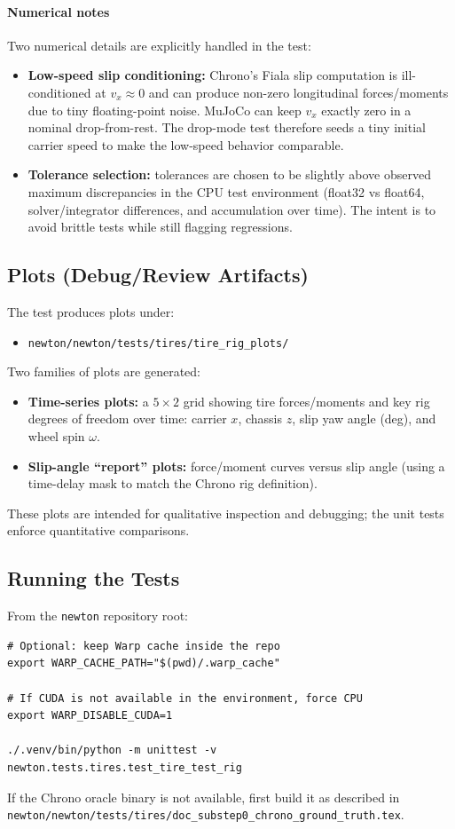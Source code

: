 \paragraph{Numerical notes}
Two numerical details are explicitly handled in the test:
\begin{itemize}
  \item \textbf{Low-speed slip conditioning:}
    Chrono's Fiala slip computation is ill-conditioned at $v_x \approx 0$ and can produce non-zero longitudinal forces/moments due
    to tiny floating-point noise. MuJoCo can keep $v_x$ exactly zero in a nominal drop-from-rest. The drop-mode test therefore seeds a
    tiny initial carrier speed to make the low-speed behavior comparable.
  \item \textbf{Tolerance selection:}
    tolerances are chosen to be slightly above observed maximum discrepancies in the CPU test environment (float32 vs float64,
    solver/integrator differences, and accumulation over time). The intent is to avoid brittle tests while still flagging regressions.
\end{itemize}

\subsection{Plots (Debug/Review Artifacts)}
The test produces plots under:
\begin{itemize}
  \item \texttt{newton/newton/tests/tires/tire\_rig\_plots/}
\end{itemize}

Two families of plots are generated:
\begin{itemize}
  \item \textbf{Time-series plots:} a $5\times2$ grid showing tire forces/moments and key rig degrees of freedom over time:
    carrier $x$, chassis $z$, slip yaw angle (deg), and wheel spin $\omega$.
  \item \textbf{Slip-angle ``report'' plots:} force/moment curves versus slip angle (using a time-delay mask to match the Chrono rig definition).
\end{itemize}
These plots are intended for qualitative inspection and debugging; the unit tests enforce quantitative comparisons.

\subsection{Running the Tests}
From the \texttt{newton} repository root:
\begin{verbatim}
# Optional: keep Warp cache inside the repo
export WARP_CACHE_PATH="$(pwd)/.warp_cache"

# If CUDA is not available in the environment, force CPU
export WARP_DISABLE_CUDA=1

./.venv/bin/python -m unittest -v newton.tests.tires.test_tire_test_rig
\end{verbatim}

If the Chrono oracle binary is not available, first build it as described in
\texttt{newton/newton/tests/tires/doc\_substep0\_chrono\_ground\_truth.tex}.
